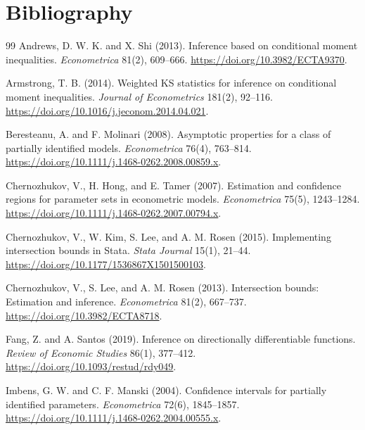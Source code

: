 \documentclass[11pt]{article}
\theoremstyle{definition}
\theoremstyle{plain}
\theoremstyle{remark}
\begin{document}
\section*{Bibliography}
\begin{thebibliography}{99}
Andrews, D. W. K. and X. Shi (2013).
\newblock Inference based on conditional moment inequalities.
\newblock \emph{Econometrica} 81(2), 609--666.
\newblock \url{https://doi.org/10.3982/ECTA9370}.

Armstrong, T. B. (2014).
\newblock Weighted KS statistics for inference on conditional moment inequalities.
\newblock \emph{Journal of Econometrics} 181(2), 92--116.
\newblock \url{https://doi.org/10.1016/j.jeconom.2014.04.021}.

Beresteanu, A. and F. Molinari (2008).
\newblock Asymptotic properties for a class of partially identified models.
\newblock \emph{Econometrica} 76(4), 763--814.
\newblock \url{https://doi.org/10.1111/j.1468-0262.2008.00859.x}.

Chernozhukov, V., H. Hong, and E. Tamer (2007).
\newblock Estimation and confidence regions for parameter sets in econometric models.
\newblock \emph{Econometrica} 75(5), 1243--1284.
\newblock \url{https://doi.org/10.1111/j.1468-0262.2007.00794.x}.

Chernozhukov, V., W. Kim, S. Lee, and A. M. Rosen (2015).
\newblock Implementing intersection bounds in Stata.
\newblock \emph{Stata Journal} 15(1), 21--44.
\newblock \url{https://doi.org/10.1177/1536867X1501500103}.

Chernozhukov, V., S. Lee, and A. M. Rosen (2013).
\newblock Intersection bounds: Estimation and inference.
\newblock \emph{Econometrica} 81(2), 667--737.
\newblock \url{https://doi.org/10.3982/ECTA8718}.

Fang, Z. and A. Santos (2019).
\newblock Inference on directionally differentiable functions.
\newblock \emph{Review of Economic Studies} 86(1), 377--412.
\newblock \url{https://doi.org/10.1093/restud/rdy049}.

Imbens, G. W. and C. F. Manski (2004).
\newblock Confidence intervals for partially identified parameters.
\newblock \emph{Econometrica} 72(6), 1845--1857.
\newblock \url{https://doi.org/10.1111/j.1468-0262.2004.00555.x}.


\end{thebibliography}
\end{document}
